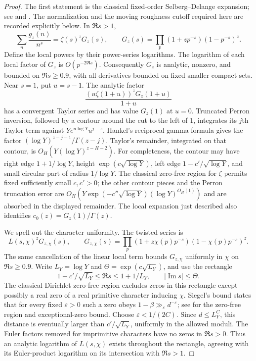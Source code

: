 \begin{proof}
The first statement is the classical fixed-order Selberg--Delange expansion;
see \cite[Theorem~1]{GranvilleKoukoulopoulos2019} and
\cite[Theorem~13.2]{Koukoulopoulos2019}. The normalization and the moving
roughness cutoff required here are recorded explicitly below. In $\Re s>1$,
\[
 \sum_n\frac{g_z(n)}{n^s}=\zeta(s)^z G_z(s),\qquad
 G_z(s)=\prod_p(1+zp^{-s})(1-p^{-s})^z.
\]
Define the local powers by their power-series logarithms.  The logarithm of
each local factor of $G_z$ is $O(p^{-2\Re s})$.  Consequently $G_z$ is analytic,
nonzero, and bounded on $\Re s\ge0.9$, with all derivatives bounded on fixed
smaller compact sets.  Near $s=1$, put $u=s-1$.  The analytic factor
\[
 \frac{(u\zeta(1+u))^zG_z(1+u)}{1+u}
\]
has a convergent Taylor series and has value $G_z(1)$ at $u=0$.
Truncated Perron inversion, followed by a contour around the cut to the left
of $1$, integrates its $j$th Taylor term against
$Y e^{u\log Y}u^{j-z}$.  Hankel's reciprocal-gamma formula gives the factor
$(\log Y)^{z-j-1}/\Gamma(z-j)$.  Taylor's remainder, integrated on that
contour, is $O_H(Y(\log Y)^{z-H-2})$.  For completeness, the contour may have
right edge $1+1/\log Y$, height $\exp(c\sqrt{\log Y})$, left edge
$1-c'/\sqrt{\log Y}$, and small circular part of radius $1/\log Y$.
The classical zero-free region for $\zeta$ permits fixed sufficiently small
$c,c'>0$; the other contour pieces and the Perron truncation error are
$O_H(Y\exp(-c''\sqrt{\log Y})(\log Y)^{O_H(1)})$ and are absorbed in the
displayed remainder.  The local expansion just described also identifies
$c_0(z)=G_z(1)/\Gamma(z)$.

We spell out the character uniformity.  The twisted series is
\[
 L(s,\chi)^zG_{z,\chi}(s),\qquad
 G_{z,\chi}(s)=
  \prod_p(1+z\chi(p)p^{-s})(1-\chi(p)p^{-s})^z.
\]
The same cancellation of the linear local term bounds $G_{z,\chi}$ uniformly
in $\chi$ on $\Re s\ge0.9$.  Write $L_Y=\log Y$ and
$\Theta=\exp(c\sqrt{L_Y})$, and use the rectangle
\[
 1-c'/\sqrt{L_Y}\le\Re s\le1+1/L_Y,\qquad
 |\operatorname{Im}s|\le\Theta.
\]
The classical Dirichlet zero-free region excludes zeros in this rectangle
except possibly a real zero of a real primitive character inducing $\chi$.
Siegel's bound states that for every fixed $\varepsilon>0$ such a zero obeys
$1-\beta\gg_\varepsilon d^{-\varepsilon}$; see
\cite[Theorems~12.3 and~12.10]{Koukoulopoulos2019} for the zero-free region
and exceptional-zero bound. Choose
$\varepsilon<1/(2C)$.  Since $d\le L_Y^C$, this distance is eventually larger
than $c'/\sqrt{L_Y}$, uniformly in the allowed moduli.  The Euler factors
removed for imprimitive characters have no zeros in $\Re s>0$.
Thus an analytic logarithm of $L(s,\chi)$ exists throughout the rectangle,
agreeing with its Euler-product logarithm on its intersection with
$\Re s>1$.


\end{proof}
